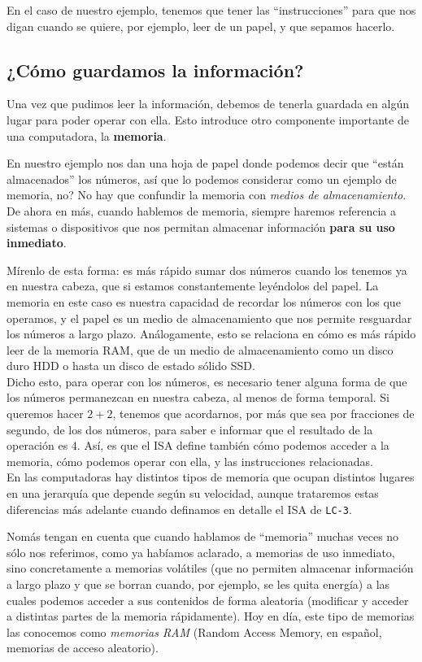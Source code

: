\documentclass[a4paper, titlepage]{report}
\begin{document}
	En el caso de nuestro ejemplo, tenemos que tener las ``instrucciones'' para que nos digan cuando se quiere, por ejemplo, leer de un papel, y que sepamos hacerlo.
	
	\subsection{¿Cómo guardamos la información?}
	\label{sec:isa-memory-intro}
	
	Una vez que pudimos leer la información, debemos de tenerla guardada en algún lugar para poder operar con ella. Esto introduce otro componente importante de una computadora, la \textbf{memoria}.
	
	En nuestro ejemplo nos dan una hoja de papel donde podemos decir que ``están almacenados'' los números, así que lo podemos considerar como un ejemplo de memoria, no? No hay que confundir la memoria con \textit{medios de almacenamiento}. De ahora en más, cuando hablemos de memoria, siempre haremos referencia a sistemas o dispositivos que nos permitan almacenar información \textbf{para su uso inmediato}.
	
	Mírenlo de esta forma: es más rápido sumar dos números cuando los tenemos ya en nuestra cabeza, que si estamos constantemente leyéndolos del papel. La memoria en este caso es nuestra capacidad de recordar los números con los que operamos, y el papel es un medio de almacenamiento que nos permite resguardar los números a largo plazo. Análogamente, esto se relaciona en cómo es más rápido leer de la memoria RAM, que de un medio de almacenamiento como un disco duro HDD o hasta un disco de estado sólido SSD.\\
	
	Dicho esto, para operar con los números, es necesario tener alguna forma de que los números permanezcan en nuestra cabeza, al menos de forma temporal. Si queremos hacer $2+2$, tenemos que acordarnos, por más que sea por fracciones de segundo, de los dos números, para saber e informar que el resultado de la operación es $4$. Así, es que el ISA define también cómo podemos acceder a la memoria, cómo podemos operar con ella, y las instrucciones relacionadas.\\
	
	En las computadoras hay distintos tipos de memoria que ocupan distintos lugares en una jerarquía que depende según su velocidad, aunque trataremos estas diferencias más adelante cuando definamos en detalle el ISA de \texttt{LC-3}.
	
	Nomás tengan en cuenta que cuando hablamos de ``memoria'' muchas veces no sólo nos referimos, como ya habíamos aclarado, a memorias de uso inmediato, sino concretamente a memorias volátiles (que no permiten almacenar información a largo plazo y que se borran cuando, por ejemplo, se les quita energía) a las cuales podemos acceder a sus contenidos de forma aleatoria (modificar y acceder a distintas partes de la memoria rápidamente). Hoy en día, este tipo de memorias las conocemos como \textit{memorias RAM} (Random Access Memory, en español, memorias de acceso aleatorio).
	
\end{document}
